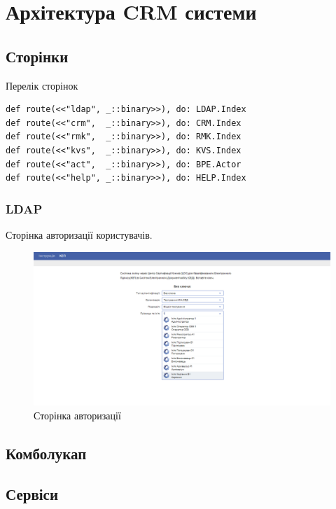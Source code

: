 \newpage
\section{Архітектура CRM системи}

\subsection{Сторінки}

Перелік сторінок

\begin{lstlisting}
def route(<<"ldap", _::binary>>), do: LDAP.Index
def route(<<"crm",  _::binary>>), do: CRM.Index
def route(<<"rmk",  _::binary>>), do: RMK.Index
def route(<<"kvs",  _::binary>>), do: KVS.Index
def route(<<"act",  _::binary>>), do: BPE.Actor
def route(<<"help", _::binary>>), do: HELP.Index
\end{lstlisting}

\subsubsection{LDAP}

Сторінка авторизації користувачів.

\begin{figure}[!htbp]
\centerline{\includegraphics[scale=0.25]{LDAP.PNG}}
\caption{Сторінка авторизації}
\end{figure}

\subsection{Комболукап}

\subsection{Сервіси}

